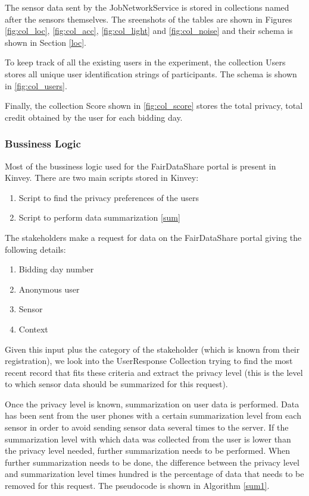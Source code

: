 The sensor data sent by the JobNetworkService is stored in collections named after the sensors themselves. The sreenshots of the tables
are shown in Figures \ref{fig:col_loc}, \ref{fig:col_acc}, \ref{fig:col_light} and \ref{fig:col_noise} and their schema is shown in Section \ref{loc}.

To keep track of all the existing users in the experiment, the collection Users stores all unique user identification strings of participants.
The schema is shown in \ref{fig:col_users}.

Finally, the collection Score shown in \ref{fig:col_score} stores the total privacy, total credit obtained by the user for each bidding day.

\subsubsection{Bussiness Logic} \label{bl}
Most of the bussiness logic used for the FairDataShare portal is present in Kinvey. There are two main scripts stored in Kinvey:

\begin{enumerate}
    \item Script to find the privacy preferences of the users
    \item Script to perform data summarization \ref{sum}
\end{enumerate}

The stakeholders make a request for data on the FairDataShare portal giving the following details:

\begin{enumerate}
    \item Bidding day number
    \item Anonymous user
    \item Sensor
    \item Context
\end{enumerate}

Given this input plus the category of the stakeholder (which is known from their registration), we look into the UserResponse Collection trying to find the most recent record that
fits these criteria and extract the privacy level (this is the level to which sensor data should be summarized for this request).

Once the privacy level is known, summarization on user data is performed. Data has been sent from the user phones with a certain summarization level from each sensor in order to avoid sending sensor data several times to the server. If the summarization level with which data was collected from the user is lower than the privacy level needed, further summarization needs to be performed. When further summarization needs to be done, the difference between the privacy level and summarization level times hundred is the percentage of data that needs to be removed for this request. The pseudocode is shown in Algorithm \ref{sum1}.


